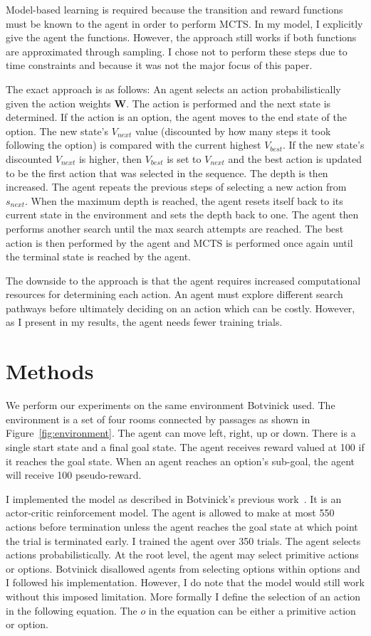 Model-based learning is required because the transition and reward functions must be known to the agent in order to perform MCTS. In my model, I explicitly give the agent the functions. However, the approach still works if both functions are approximated through sampling. I chose not to perform these steps due to time constraints and because it was not the major focus of this paper.

The exact approach is as follows: An agent selects an action probabilistically given the action weights \textbf{W}. The action is performed and the next state is determined. If the action is an option, the agent moves to the end state of the option. The new state's $V_{next}$ value (discounted by how many steps it took following the option) is compared with the current highest $V_{best}$. If the new state's discounted $V_{next}$ is higher, then $V_{best}$ is set to $V_{next}$ and the best action is updated to be the first action that was selected in the sequence. The depth is then increased. The agent repeats the previous steps of selecting a new action from $s_{next}$. When the maximum depth is reached, the agent resets itself back to its current state in the environment and sets the depth back to one. The agent then performs another search until the max search attempts are reached. The best action is then performed by the agent and MCTS is performed once again until the terminal state is reached by the agent.

The downside to the approach is that the agent requires increased computational resources for determining each action. An agent must explore different search pathways before ultimately deciding on an action which can be costly. However, as I present in my results, the agent needs fewer training trials.

\section{Methods}
We perform our experiments on the same environment Botvinick used. The environment is a set of four rooms connected by passages as shown in Figure~\ref{fig:environment}. The agent can move left, right, up or down. There is a single start state and a final goal state. The agent receives reward valued at 100 if it reaches the goal state. When an agent reaches an option's sub-goal, the agent will receive 100 pseudo-reward.

I implemented the model as described in Botvinick's previous work~\cite{botvinick2009hierarchically}. It is an actor-critic reinforcement model. The agent is allowed to make at most 550 actions before termination unless the agent reaches the goal state at which point the trial is terminated early. I trained the agent over 350 trials. The agent selects actions probabilistically. At the root level, the agent may select primitive actions or options. Botvinick disallowed agents from selecting options within options and I followed his implementation. However, I do note that the model would still work without this imposed limitation. More formally I define the selection of an action in the following equation. The $o$ in the equation can be either a primitive action or option.

